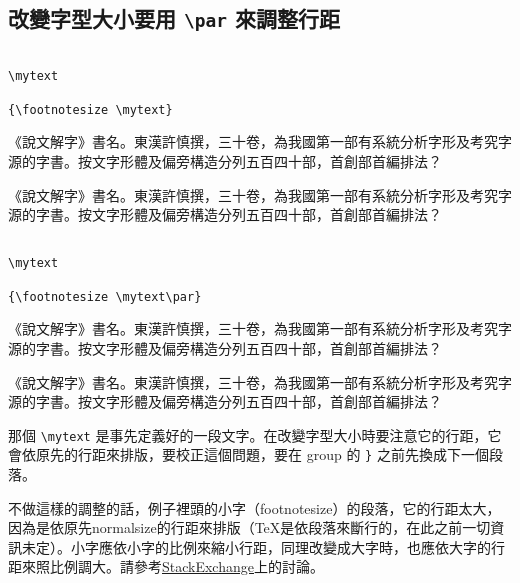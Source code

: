 \subsection{改變字型大小要用 \texttt{\textbackslash par} 來調整行距}

\def\mytext{%
《說文解字》書名。東漢許慎撰，三十卷，為我國第一部有系統分析字形及考究字源的字書。按文字形體及偏旁構造分列五百四十部，首創部首編排法？}

\begin{Wrong}
\begin{verbatim}

\mytext

{\footnotesize \mytext}

\end{verbatim}
\mytext

{\footnotesize \mytext}
\end{Wrong}

\begin{Right}
\begin{verbatim}

\mytext

{\footnotesize \mytext\par}

\end{verbatim}
\mytext

{\footnotesize \mytext\par}
\end{Right}
那個 \verb|\mytext| 是事先定義好的一段文字。在改變字型大小時要注意它的行距，它會依原先的行距來排版，要校正這個問題，要在 group 的 \verb|}| 之前先換成下一個段落。

不做這樣的調整的話，例子裡頭的小字（footnotesize）的段落，它的行距太大，因為是依原先normalsize的行距來排版（\TeX 是依段落來斷行的，在此之前一切資訊未定）。小字應依小字的比例來縮小行距，同理改變成大字時，也應依大字的行距來照比例調大。請參考\href{https://tex.stackexchange.com/questions/444039/why-do-i-have-to-use-par-if-i-change-font-size-withing-a-group-scope}{\textsf{StackExchange}}上的討論。

\marginpar{\back}
